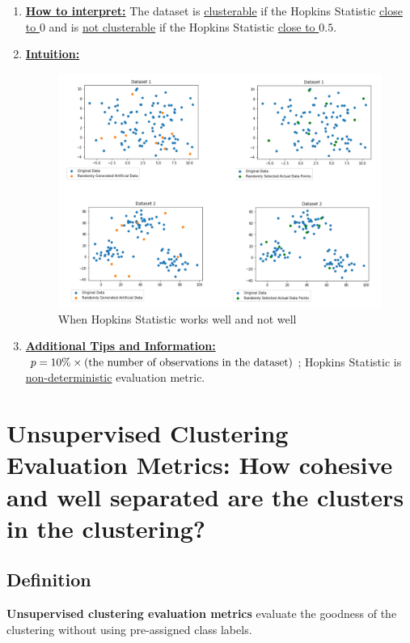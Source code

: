 \documentclass[11pt]{elegantbook}
\begin{document}
\begin{enumerate}[$\bullet$]
\begin{enumerate}[$(1)$]
    \end{enumerate}
    \item \textbf{\underline{How to interpret:}} The dataset is \underline{clusterable} if the Hopkins Statistic \underline{close to $0$} and is \underline{not clusterable} if the Hopkins Statistic \underline{close to $0.5$}.
    \item \textbf{\underline{Intuition:}}
    \begin{center}\begin{figure}[htbp]
        \centering
        \includegraphics[scale=0.25]{HS.png}
        \caption{When Hopkins Statistic works well and not well}
        \label{}
    \end{figure}\end{center}
    \item \textbf{\underline{Additional Tips and Information:}} $p=10\%\times \textnormal{(the number of observations in the dataset)}$; Hopkins Statistic is \underline{non-deterministic} evaluation metric.
\end{enumerate}

\section{Unsupervised Clustering Evaluation Metrics: How cohesive and well separated are the clusters in the
clustering?}
\subsection{Definition}
\begin{definition}
    \textbf{Unsupervised clustering evaluation metrics} evaluate the goodness of the clustering without using pre-assigned class labels.
\end{definition}
\end{document}

